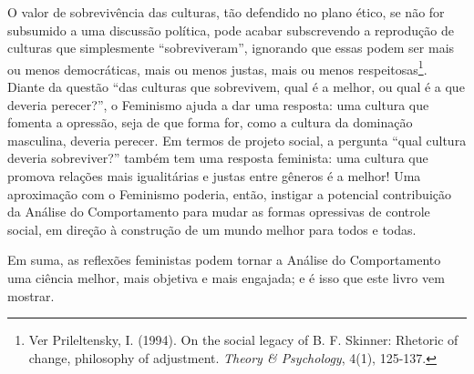 O valor de sobrevivência das culturas, tão defendido no plano ético, se não for subsumido a uma discussão política, pode acabar subscrevendo a reprodução de culturas que simplesmente “sobreviveram”, ignorando que essas podem ser mais ou menos democráticas, mais ou menos justas, mais ou menos respeitosas\footnote{Ver Prileltensky, I. (1994). On the social legacy of B. F. Skinner: Rhetoric of change, philosophy of adjustment. \emph{Theory \& Psychology}, 4(1), 125-137.}. Diante da questão “das culturas que sobrevivem, qual é a melhor, ou qual é a que deveria perecer?”, o Feminismo ajuda a dar uma resposta: uma cultura que fomenta a opressão, seja de que forma for, como a cultura da dominação masculina, deveria perecer. Em termos de projeto social, a pergunta ``qual cultura deveria sobreviver?'' também tem uma resposta feminista: uma cultura que promova relações mais igualitárias e justas entre gêneros é a melhor! Uma aproximação com o Feminismo poderia, então, instigar a potencial contribuição da Análise do Comportamento para mudar as formas opressivas de controle social, em direção à construção de um mundo melhor para todos e todas. 

Em suma, as reflexões feministas podem tornar a Análise do Comportamento uma ciência melhor, mais objetiva e mais engajada; e é isso que este livro vem mostrar. 